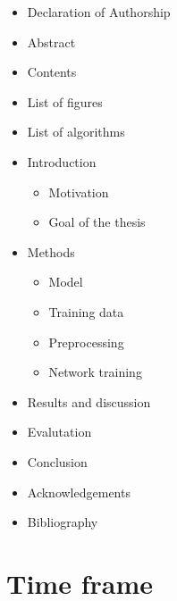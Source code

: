 \documentclass[11pt,
  paper=a4, 
  bibliography=totocnumbered,
	captions=tableheading,
	BCOR=10mm
]{scrreprt}
\theoremstyle{definition}
\begin{document}
\begin{itemize}
	\item Declaration of Authorship
	\item Abstract
	\item Contents
	\item List of figures
	\item List of algorithms
	\item Introduction
	\begin{itemize}
		\item Motivation
		\item Goal of the thesis
	\end{itemize}
	\item Methods
	\begin{itemize}
		\item Model
		\item Training data
		\item Preprocessing
		\item Network training
	\end{itemize}
	\item Results and discussion
	\item Evalutation
	\item Conclusion
	\item Acknowledgements
	\item Bibliography
\end{itemize}

\chapter{Time frame}
\end{document}
